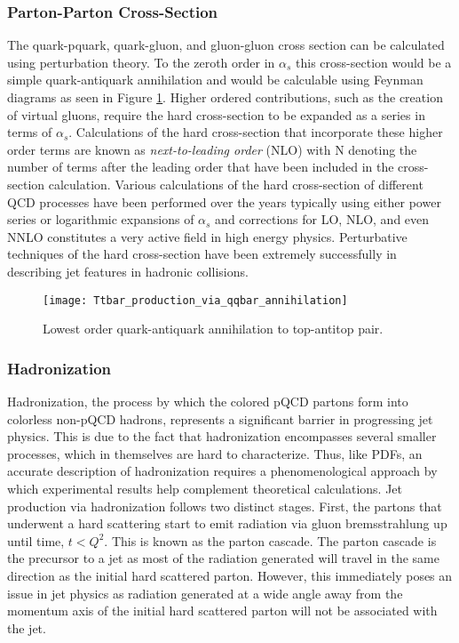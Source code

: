 \subsubsection{Parton-Parton Cross-Section}
The quark-pquark, quark-gluon, and gluon-gluon cross section can be calculated using perturbation theory.  To the zeroth order in $\alpha_{s}$ this cross-section would be a simple quark-antiquark annihilation and would be calculable using Feynman diagrams as seen in Figure \ref{fig:qqbar}\cite{Collins:1989gx}.  Higher ordered contributions, such as the creation of virtual gluons, require the hard cross-section to be expanded as a series in terms of $\alpha_{s}$.  Calculations of the hard cross-section that incorporate these higher order terms are known as \textit{next-to-leading order} (NLO) with N denoting the number of terms after the leading order that have been included in the cross-section calculation.  Various calculations of the hard cross-section of different QCD processes have been performed over the years typically using either power series or logarithmic expansions of $\alpha_{s}$\cite{Brambilla:2006wp} and corrections for LO, NLO, and even NNLO constitutes a very active field in high energy physics.  Perturbative techniques of the hard cross-section have been extremely successfully in describing jet features in hadronic collisions\cite{Fritzsch:1992mu}.

\begin{figure}[h]
\texttt{[image: Ttbar\_production\_via\_qqbar\_annihilation]}
\centering
\caption{Lowest order quark-antiquark annihilation to top-antitop pair\cite{Erdmann:2001ne}.}
\label{fig:qqbar}
\end{figure}

\subsubsection{Hadronization}

Hadronization, the process by which the colored pQCD partons form into colorless non-pQCD hadrons, represents a significant barrier in progressing jet physics.  This is due to the fact that hadronization encompasses several smaller processes, which in themselves are hard to characterize. Thus, like PDFs, an accurate description of hadronization requires a phenomenological approach by which experimental results help complement theoretical calculations.  Jet production via hadronization\cite{Webber:1994zd} follows two distinct stages.  First, the partons that underwent a hard scattering start to emit radiation via gluon bremsstrahlung up until time, $t < Q^{2}$.  This is known as the parton cascade.  The parton cascade is the precursor to a jet as most of the radiation generated will travel in the same direction as the initial hard scattered parton.  However, this immediately poses an issue in jet physics as radiation generated at a wide angle away from the momentum axis of the initial hard scattered parton will not be associated with the jet.


